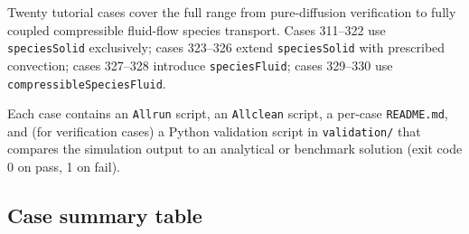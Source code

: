 \documentclass[11pt,a4paper]{article}
\begin{document}
Twenty tutorial cases cover the full range from pure-diffusion verification
to fully coupled compressible fluid-flow species transport.  Cases 311--322 use
\texttt{speciesSolid} exclusively; cases 323--326 extend \texttt{speciesSolid}
with prescribed convection; cases 327--328 introduce \texttt{speciesFluid};
cases 329--330 use \texttt{compressibleSpeciesFluid}.

Each case contains an \texttt{Allrun} script, an \texttt{Allclean} script,
a per-case \texttt{README.md}, and (for verification cases) a Python
validation script in \texttt{validation/} that compares the simulation output
to an analytical or benchmark solution (exit code 0 on pass, 1 on fail).

\subsection{Case summary table}
\end{document}
